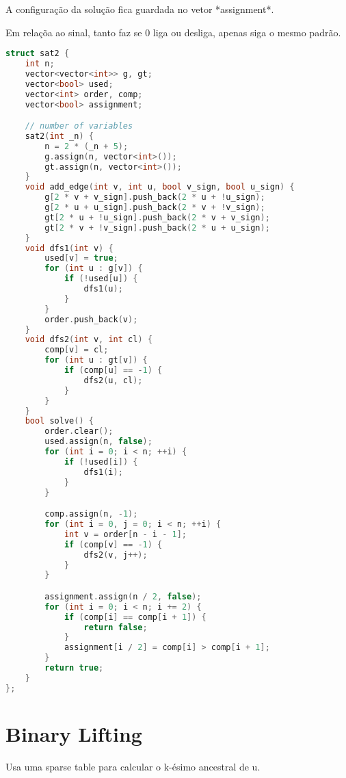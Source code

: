 \documentclass[11pt, a4paper, oneside]{book}
\begin{document}
A configuração da solução fica guardada no vetor *assignment*. 



Em relaçõa ao sinal, tanto faz se 0 liga ou desliga, apenas siga o mesmo padrão.

\hfill

\begin{multicols}{2}
\begin{lstlisting}[language=C++]
struct sat2 {
    int n;
    vector<vector<int>> g, gt;
    vector<bool> used;
    vector<int> order, comp;
    vector<bool> assignment;

    // number of variables
    sat2(int _n) {
        n = 2 * (_n + 5);
        g.assign(n, vector<int>());
        gt.assign(n, vector<int>());
    }
    void add_edge(int v, int u, bool v_sign, bool u_sign) {
        g[2 * v + v_sign].push_back(2 * u + !u_sign);
        g[2 * u + u_sign].push_back(2 * v + !v_sign);
        gt[2 * u + !u_sign].push_back(2 * v + v_sign);
        gt[2 * v + !v_sign].push_back(2 * u + u_sign);
    }
    void dfs1(int v) {
        used[v] = true;
        for (int u : g[v]) {
            if (!used[u]) {
                dfs1(u);
            }
        }
        order.push_back(v);
    }
    void dfs2(int v, int cl) {
        comp[v] = cl;
        for (int u : gt[v]) {
            if (comp[u] == -1) {
                dfs2(u, cl);
            }
        }
    }
    bool solve() {
        order.clear();
        used.assign(n, false);
        for (int i = 0; i < n; ++i) {
            if (!used[i]) {
                dfs1(i);
            }
        }

        comp.assign(n, -1);
        for (int i = 0, j = 0; i < n; ++i) {
            int v = order[n - i - 1];
            if (comp[v] == -1) {
                dfs2(v, j++);
            }
        }

        assignment.assign(n / 2, false);
        for (int i = 0; i < n; i += 2) {
            if (comp[i] == comp[i + 1]) {
                return false;
            }
            assignment[i / 2] = comp[i] > comp[i + 1];
        }
        return true;
    }
};
\end{lstlisting}
\end{multicols}

\hfill

\section{Binary Lifting}


Usa uma sparse table para calcular o k-ésimo ancestral de u.
\end{document}
